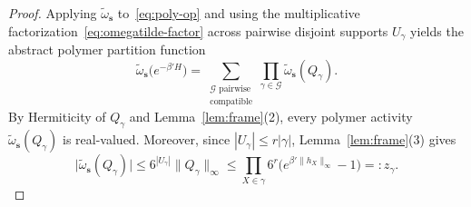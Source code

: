 \documentclass[11pt,a4paper]{article}
\numberwithin{equation}{section}
\theoremstyle{plain}
\theoremstyle{definition}
\begin{document}
\begin{proof}
Applying $\widetilde{\omega}_{\mathbf{s}}$ to~\eqref{eq:poly-op} and using the multiplicative factorization~\eqref{eq:omegatilde-factor} across pairwise disjoint supports $U_\gamma$ yields the abstract polymer partition function
\[
  \widetilde{\omega}_{\mathbf{s}}\bigl(e^{-\beta' H}\bigr)
  = \sum_{\substack{\mathcal{G}\text{ pairwise}\\\text{compatible}}} \prod_{\gamma\in\mathcal{G}} \widetilde{\omega}_{\mathbf{s}}(Q_\gamma).
\]
By Hermiticity of $Q_\gamma$ and Lemma~\ref{lem:frame}(2), every polymer activity $\widetilde{\omega}_{\mathbf{s}}(Q_\gamma)$ is real-valued. Moreover, since $|U_\gamma| \le r|\gamma|$, Lemma~\ref{lem:frame}(3) gives
\[
  \bigl|\widetilde{\omega}_{\mathbf{s}}(Q_\gamma)\bigr|
  \le 6^{|U_\gamma|}\|Q_\gamma\|_\infty
  \le \prod_{X\in\gamma} 6^r\bigl(e^{\beta'\|h_X\|_\infty} - 1\bigr) =: z_\gamma.
\]


\end{proof}
\end{document}
